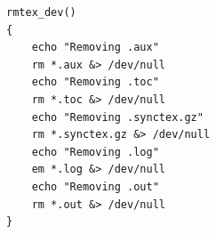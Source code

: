 \begin{lstlisting}[frame=single]
rmtex_dev()
{
	echo "Removing .aux"
	rm *.aux &> /dev/null
	echo "Removing .toc"
	rm *.toc &> /dev/null
	echo "Removing .synctex.gz"
	rm *.synctex.gz &> /dev/null
	echo "Removing .log"
	em *.log &> /dev/null
	echo "Removing .out"
	rm *.out &> /dev/null
}
\end{lstlisting}